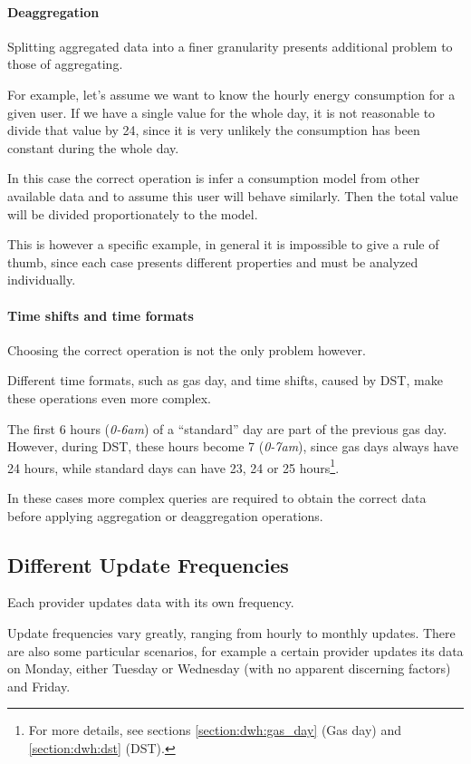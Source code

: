     \paragraph{Deaggregation}
        Splitting aggregated data into a finer granularity presents additional problem to those of aggregating.
        
        For example, let's assume we want to know the hourly energy consumption for a given user.
        If we have a single value for the whole day, it is not reasonable to divide that value by 24, since it is very unlikely the consumption has been constant during the whole day.
        
        In this case the correct operation is infer a consumption model from other available data and to assume this user will behave similarly.
        Then the total value will be divided proportionately to the model.
        
        This is however a specific example, in general it is impossible to give a rule of thumb, since each case presents different properties and must be analyzed individually.
        
    \paragraph{Time shifts and time formats}
        Choosing the correct operation is not the only problem however.
        
        Different time formats, such as gas day, and time shifts, caused by DST, make these operations even more complex.
        
        The first 6 hours (\textit{0-6am}) of a ``standard'' day are part of the previous gas day.
        However, during DST, these hours become 7 (\textit{0-7am}), since gas days always have 24 hours, while standard days can have 23, 24 or 25 hours\footnote{
            For more details, see sections \ref{section:dwh:gas_day} (Gas day) and \ref{section:dwh:dst} (DST).
        }.
        
        In these cases more complex queries are required to obtain the correct data before applying aggregation or deaggregation operations.
    
\subsection{Different Update Frequencies}
    Each provider updates data with its own frequency.
    
    Update frequencies vary greatly, ranging from hourly to monthly updates.
    There are also some particular scenarios, for example a certain provider updates its data on Monday, either Tuesday or Wednesday (with no apparent discerning factors) and Friday.
    
